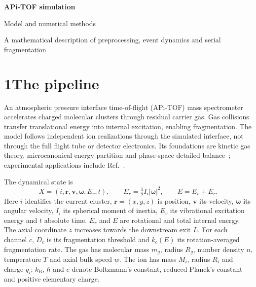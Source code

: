 \documentclass[10pt,a4paper]{article}
\newcommand{\kb}{k_{\mathrm B}}
\newcommand{\overview}[2]{\section*{#1\quad #2}\addcontentsline{toc}{section}{#1 #2}}
\begin{document}
\begin{center}
{\LARGE\bfseries APi-TOF simulation}\par\vspace{4pt}
{\large Model and numerical methods}\par\vspace{3pt}
{\small A mathematical description of preprocessing, event dynamics and serial fragmentation}
\end{center}

\overview{1}{The pipeline}
An atmospheric pressure interface time-of-flight (APi-TOF) mass spectrometer
accelerates charged molecular clusters through residual carrier gas. Gas collisions
transfer translational energy into internal excitation, enabling fragmentation.
The model follows independent ion realizations through the simulated interface,
not through the full flight tube or detector electronics. Its foundations are
kinetic gas theory, microcanonical energy partition and phase-space detailed
balance~\cite{zapadinsky,si,zanca}; experimental applications include
Ref.~\cite{alfaouri}.

\begin{center}
\end{center}

The dynamical state is
\[
 X=(i,\mathbf r,\mathbf v,\boldsymbol\omega,E_v,t),\qquad
 E_r=\tfrac12 I_i|\boldsymbol\omega|^2,\qquad E=E_v+E_r.
\]
Here $i$ identifies the current cluster, $\mathbf r=(x,y,z)$ is position,
$\mathbf v$ its velocity, $\boldsymbol\omega$ its angular velocity, $I_i$ its
spherical moment of inertia, $E_v$ its vibrational excitation energy and $t$
absolute time. $E_r$ and $E$ are rotational and total internal energy.
The axial coordinate $z$ increases towards the downstream exit $L$.
For each channel $c$, $D_c$ is its fragmentation threshold and $k_c(E)$ its
rotation-averaged fragmentation rate. The gas has molecular mass $m_g$, radius
$R_g$, number density $n$, temperature $T$ and axial bulk speed $w$.
The ion has mass $M_i$, radius $R_i$ and charge $q_i$; $\kb$, $\hbar$ and $e$
denote Boltzmann's constant, reduced Planck's constant and positive elementary charge.
\end{document}
